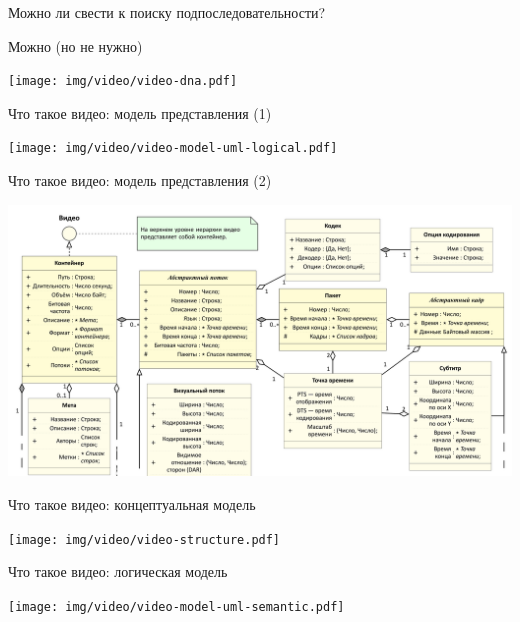 \begin{frame}{Можно ли свести к поиску подпоследовательности?}
    \begin{orange-box}{Можно (но не нужно)}
        \begin{center}
            \texttt{[image: img/video/video-dna.pdf]}
        \end{center}
    \end{orange-box}
\end{frame}

\newcommand{\epath}{./img/video/events}

\newcommand{\eventexample}[1]{
    \texttt{[image: \\epath/Djadja-Stepa-Milicioner-\#1.png]}
}


\begin{frame}{Что такое видео: модель представления (1)}
    \begin{center}
        \texttt{[image: img/video/video-model-uml-logical.pdf]}
    \end{center}
\end{frame}

\begin{frame}{Что такое видео: модель представления (2)}
    \begin{center}
        \includegraphics[width=1.05\textwidth]{img/video/video-model-uml-logical.png}
    \end{center}
\end{frame}


\begin{frame}{Что такое видео: концептуальная модель}
    \begin{center}
        \texttt{[image: img/video/video-structure.pdf]}
    \end{center}
\end{frame}

\begin{frame}{Что такое видео: логическая модель}
    \begin{center}
        \texttt{[image: img/video/video-model-uml-semantic.pdf]}
    \end{center}
\end{frame}




